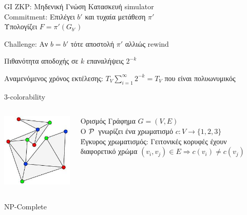 \documentclass[10pt,handout]{beamer}
\begin{document}
\begin{frame}{GI ZKP: Μηδενική Γνώση}
	Κατασκευή simulator \siml \\ \pause 
	Commitment: Επιλέγει $b'$ και τυχαία μετάθεση $\pi'$ \\ \pause 
	Υπολογίζει $F = \pi'(G_{b'})$

	Challenge: Αν $b=b'$ τότε αποστολή $\pi'$ αλλιώς rewind

	Πιθανότητα αποδοχής σε $k$ επαναλήψεις $2^{-k}$

	Αναμενόμενος χρόνος εκτέλεσης: $T_V \sum_{i=1}^{\infty} 2^{-k} = T_V$ που είναι πολυωνυμικός
\end{frame}

\begin{frame}{3-colorability}
\begin{columns}
\begin{center}
\includegraphics[scale=0.5]{3cp.jpg}
\end{center}

\begin{block}{Ορισμός}
Γράφημα $G=(V,E)$ \\ \pause
O $\mathcal{P}\,$  γνωρίζει ένα χρωματισμό  $c:V \rightarrow \{ 1,2,3 \}$  \\ \pause
Έγκυρος χρωματισμός: Γειτονικές κορυφές έχουν διαφορετικό χρώμα
$(v_i, v_j) \in E \Rightarrow   c(v_i) \neq c(v_j)$\\
\end{block}
\end{columns}
NP-Complete
\end{frame}
 
\end{document}
